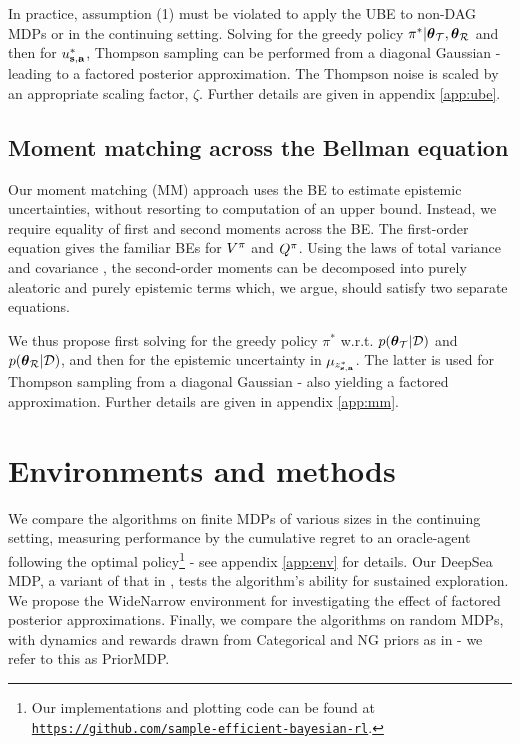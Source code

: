 \documentclass{article}
\begin{document}
In practice, assumption (1) must be violated to apply the UBE to non-DAG MDPs or in the continuing setting. Solving for the greedy policy ${\pi^*} | \boldsymbol{\theta}_{\mathcal{T}}, \boldsymbol{\theta}_{\mathcal{R}}$ and then for $u_{\mathbf{s}, \mathbf{a}}^{*}$, Thompson sampling can be performed from a diagonal Gaussian - leading to a factored posterior approximation. The Thompson noise is scaled by an appropriate scaling factor, $\zeta$. Further details are given in appendix \ref{app:ube}.

\subsection{Moment matching across the Bellman equation}

Our moment matching (MM) approach uses the BE to estimate epistemic uncertainties, without resorting to computation of an upper bound. Instead, we require equality of first and second moments across the BE. The first-order equation gives the familiar BEs for $V^{\pi}$ and $Q^{\pi}$. Using the laws of total variance and covariance \citep{weiss}, the second-order moments can be decomposed into purely aleatoric and purely epistemic terms which, we argue, should satisfy two separate equations.

We thus propose first solving for the greedy policy $\pi^*$ w.r.t. $p(\boldsymbol{\theta}_{\mathcal{T}} | \mathcal{D})$ and $p(\boldsymbol{\theta}_{\mathcal{R}} | \mathcal{D})$, and then for the epistemic uncertainty in $\mu_{z^*_{\mathbf{s}, \mathbf{a}}}$. The latter is used for Thompson sampling from a diagonal Gaussian - also yielding a factored approximation. Further details are given in appendix \ref{app:mm}.

\section{Environments and methods}

We compare the algorithms on finite MDPs of various sizes in the continuing setting, measuring performance by the cumulative regret to an oracle-agent following the optimal policy\footnote{Our implementations and plotting code can be found at \scriptsize{\texttt{\href{https://github.com/sample-efficient-bayesian-rl/nips-2019-rl-workshop}{https://github.com/sample-efficient-bayesian-rl}}}.} - see appendix \ref{app:env} for details. Our DeepSea MDP, a variant of that in \cite{deepsea}, tests the algorithm's ability for sustained exploration. We propose the WideNarrow environment for investigating the effect of factored posterior approximations. Finally, we compare the algorithms on random MDPs, with dynamics and rewards drawn from Categorical and NG priors as in \cite{psrl} - we refer to this as PriorMDP.
\end{document}
